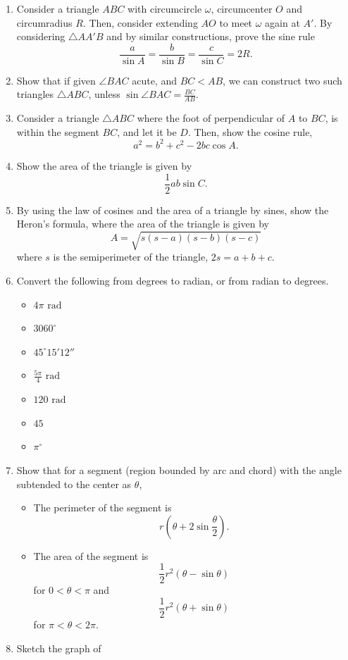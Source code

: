 \documentclass{article}
\begin{document}
\begin{enumerate}
\item Consider a triangle $ABC$ with circumcircle $\omega$, circumcenter $O$ and circumradius $R$. Then, consider extending $AO$ to meet $\omega$ again at $A'$. By considering $\triangle AA'B$ and by similar constructions, prove the sine rule \[\frac{a}{\sin A}=\frac{b}{\sin B}=\frac{c}{\sin C}=2R.\]
\item Show that if given $\angle BAC$ acute, and $BC<AB$, we can construct two such triangles $\triangle ABC$, unless $\sin \angle BAC=\frac{BC}{AB}$.
\item Consider a triangle $\triangle ABC$ where the foot of perpendicular of $A$ to $BC$, is within the segment $BC$, and let it be $D$. Then, show the cosine rule, \[a^2=b^2+c^2-2bc\cos A.\]
\item Show the area of the triangle is given by \[\frac 12 ab\sin C.\]
\item By using the law of cosines and the area of a triangle by sines, show the Heron's formula, where the area of the triangle is given by \[A=\sqrt{s(s-a)(s-b)(s-c)}\] where $s$ is the semiperimeter of the triangle, $2s=a+b+c$.
\item Convert the following from degrees to radian, or from radian to degrees.
       \begin{itemize}
              \item[(a)] $4\pi\text{ rad}$
              \item[(b)] $3060^{\circ}$
              \item[(c)] $45^{\circ}15'12''$
              \item[(d)] $\frac{5\pi}{4}\text{ rad}$
              \item[(e)] $120\text{ rad}$
              \item[(f)] $45$
              \item[(g)] $\pi^{\circ}$
       \end{itemize}
\item Show that for a segment (region bounded by arc and chord) with the angle subtended to the center as $\theta$,
       \begin{itemize}
              \item[(a)] The perimeter of the segment is \[r\left(\theta+2\sin\frac\theta2\right).\]
              \item[(b)] The area of the segment is \[\frac 12 r^2(\theta-\sin\theta)\]for $0<\theta<\pi$ and \[\frac 12 r^2(\theta+\sin\theta)\]for $\pi<\theta<2\pi$.
       \end{itemize}
\item Sketch the graph of

\end{enumerate}
\end{document}
